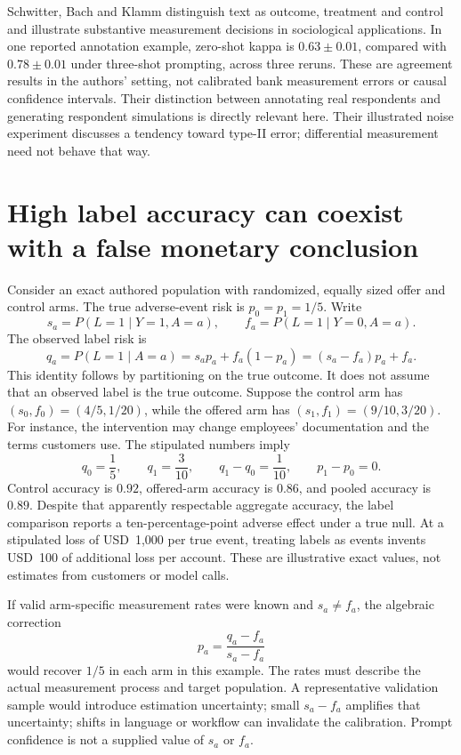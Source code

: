 Schwitter, Bach and Klamm distinguish text as outcome, treatment and control
and illustrate substantive measurement decisions in sociological
applications. In one reported annotation example, zero-shot kappa is
\(0.63\pm0.01\), compared with \(0.78\pm0.01\) under three-shot prompting,
across three reruns. These are agreement results in the authors' setting,
not calibrated bank measurement errors or causal confidence intervals.
Their distinction between annotating real respondents and generating
respondent simulations is directly relevant here. Their illustrated noise
experiment discusses a tendency toward type-II error; differential
measurement need not behave that way.~\citep{exec17_ontology_sociology}

\section{High label accuracy can coexist with a false monetary conclusion}

Consider an exact authored population with randomized, equally sized offer
and control arms. The true adverse-event risk is \(p_0=p_1=1/5\). Write
\[
 s_a=P(L=1\mid Y=1,A=a),\qquad
 f_a=P(L=1\mid Y=0,A=a).
\]
The observed label risk is
\[
 q_a=P(L=1\mid A=a)=s_ap_a+f_a(1-p_a)
     =(s_a-f_a)p_a+f_a.
\]
This identity follows by partitioning on the true outcome. It does not
assume that an observed label is the true outcome. Suppose the control arm has
\((s_0,f_0)=(4/5,1/20)\), while the offered arm has
\((s_1,f_1)=(9/10,3/20)\). For instance, the intervention may change employees'
documentation and the terms customers use. The stipulated numbers imply
\[
 q_0=\frac15,\qquad q_1=\frac3{10},\qquad q_1-q_0=\frac1{10},
 \qquad p_1-p_0=0.
\]
Control accuracy is \(0.92\), offered-arm accuracy is \(0.86\), and pooled
accuracy is \(0.89\). Despite that apparently respectable aggregate accuracy,
the label comparison reports a ten-percentage-point adverse effect under a
true null. At a stipulated loss of USD~1,000 per true event, treating labels
as events invents USD~100 of additional loss per account. These are
illustrative exact values, not estimates from customers or model
calls.~\citep{exec17_ontology_oracle}

If valid arm-specific measurement rates were known and \(s_a\ne f_a\), the
algebraic correction
\[
 p_a=\frac{q_a-f_a}{s_a-f_a}
\]
would recover \(1/5\) in each arm in this example. The rates must describe the
actual measurement process and target population. A representative validation
sample would introduce estimation uncertainty; small \(s_a-f_a\) amplifies
that uncertainty; shifts in language or workflow can invalidate the
calibration. Prompt confidence is not a supplied value of \(s_a\) or \(f_a\).


